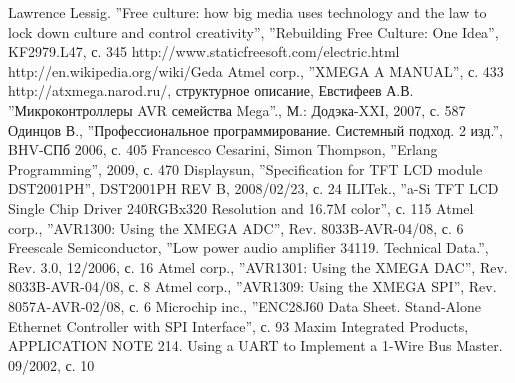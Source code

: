\documentclass[russian,simple,utf8,pointsubsection,reduceheight=20mm]{eskdtext}
\begin{document}
\begin{thebibliography}{99}
 Lawrence Lessig. ''Free culture: how big media uses technology and the law to lock down
culture and control creativity'', ''Rebuilding Free Culture: One Idea'', KF2979.L47, с. 345
 http://www.staticfreesoft.com/electric.html
 http://en.wikipedia.org/wiki/Geda
 Atmel corp., ''XMEGA A MANUAL'', с. 433
 http://atxmega.narod.ru/, структурное описание, 
 Евстифеев А.В. ''Микроконтроллеры AVR семейства Mega''., М.: Додэка-XXI, 2007, с. 587
 Одинцов В., ''Профессиональное программирование. Системный подход. 2 изд.'', BHV-СПб 2006, с. 405
 Francesco Cesarini, Simon Thompson, ''Erlang Programming'', 2009, с. 470
 Displaysun, ''Specification for TFT LCD module DST2001PH'', DST2001PH REV B, 2008/02/23, с. 24
 ILITek., ''a-Si TFT LCD Single Chip Driver 240RGBx320 Resolution and 16.7M color'', с. 115
 Atmel corp., ''AVR1300: Using the XMEGA ADC'', Rev. 8033B-AVR-04/08, с. 6
 Freescale Semiconductor, ''Low power audio amplifier 34119. Technical Data.'', Rev. 3.0, 12/2006, с. 16
 Atmel corp., ''AVR1301: Using the XMEGA DAC'', Rev. 8033B-AVR-04/08, с. 8
 Atmel corp., ''AVR1309: Using the XMEGA SPI'', Rev. 8057A-AVR-02/08, с. 6
 Microchip inc., ''ENC28J60 Data Sheet. Stand-Alone Ethernet Controller with SPI Interface'', с. 93
 Maxim Integrated Products, APPLICATION NOTE 214. Using a UART to Implement a 1-Wire Bus Master. 09/2002, с. 10

\end{thebibliography}


\end{document}
